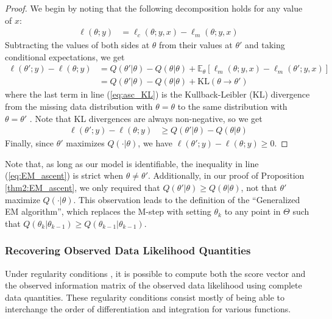 \documentclass[11pt, oneside]{article}   	%
\newcommand{\bE}{\mathbb{E}}
\begin{document}
\begin{proof}
    We begin by noting that the following decomposition holds for any value of $x$:
    \begin{align}
        \ell(\theta; y) &= \ell_c(\theta; y, x) - \ell_m(\theta; y, x)
    \end{align}
    Subtracting the values of both sides at $\theta$ from their values at $\theta'$ and taking conditional expectations, we get
    \begin{align}
        \ell(\theta'; y) - \ell(\theta; y) &= Q(\theta'|\theta) - Q(\theta|\theta) + \bE_{\theta}[\ell_m(\theta; y, x) - \ell_m(\theta'; y, x)]\\
        &= Q(\theta'|\theta) - Q(\theta|\theta) + \mathrm{KL}(\theta \rightarrow \theta') \label{eq:asc_KL}
    \end{align}
    where the last term in line (\ref{eq:asc_KL}) is the Kullback-Leibler (KL) divergence from the missing data distribution with $\theta = \theta$ to the same distribution with $\theta = \theta'$ \citep{van98}. Note that KL divergences are always non-negative, so we get
    \begin{align}
    \ell(\theta'; y) - \ell(\theta; y) &\geq Q(\theta'|\theta) - Q(\theta|\theta)  \label{eq:EM_ascent}  
    \end{align}
    Finally, since $\theta'$ maximizes $Q(\cdot|\theta)$, we have $\ell(\theta'; y) - \ell(\theta; y) \geq 0$.
\end{proof}

Note that, as long as our model is identifiable, the inequality in line (\ref{eq:EM_ascent}) is strict when $\theta \neq \theta'$. Additionally, in our proof of Proposition \ref{thm2:EM_ascent}, we only required that $Q(\theta'|\theta) \geq Q(\theta|\theta)$, not that $\theta'$ maximize $Q(\cdot|\theta)$. This observation leads to the definition of the ``Generalized EM algorithm'', which replaces the M-step with setting $\theta_k$ to any point in $\Theta$ such that $Q(\theta_k|\theta_{k-1}) \geq Q(\theta_{k-1}|\theta_{k-1})$.



\subsubsection{Recovering Observed Data Likelihood Quantities}

Under regularity conditions \citep[see][]{McL08}, it is possible to compute both the score vector and the observed information matrix of the observed data likelihood using complete data quantities. These regularity conditions consist mostly of being able to interchange the order of differentiation and integration for various functions.
\end{document}
